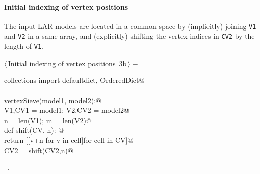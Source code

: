 \documentclass[11pt,oneside]{article}	%
\begin{document}
\paragraph{Initial indexing of vertex positions}
The input LAR models are located in a common space by (implicitly) joining \texttt{V1} and \texttt{V2} in a same array, and (explicitly) shifting the vertex indices in \texttt{CV2} by the length of \texttt{V1}.
\begin{flushleft} \small \label{scrap3}
\protect{}$\langle\,$Initial indexing of vertex positions\nobreak\ {\footnotesize 3b}$\,\rangle\equiv$
\vspace{-1ex}
\begin{list}{}{} \item
\mbox{}\verb@from collections import defaultdict, OrderedDict@\\
\mbox{}\verb@@\\
\mbox{}\verb@def vertexSieve(model1, model2):@\\
\mbox{}\verb@   V1,CV1 = model1; V2,CV2 = model2@\\
\mbox{}\verb@   n = len(V1); m = len(V2)@\\
\mbox{}\verb@   def shift(CV, n): @\\
\mbox{}\verb@      return [[v+n for v in cell]for cell in CV]@\\
\mbox{}\verb@   CV2 = shift(CV2,n)@\\
\mbox{}\verb@@{\NWsep}
\end{list}
\vspace{-1ex}
\footnotesize\addtolength{\baselineskip}{-1ex}
\begin{list}{}{\setlength{\itemsep}{-\parsep}\setlength{\itemindent}{-\leftmargin}}
\item \NWtxtMacroRefIn\ .
\end{list}
\end{flushleft}
\end{document}
